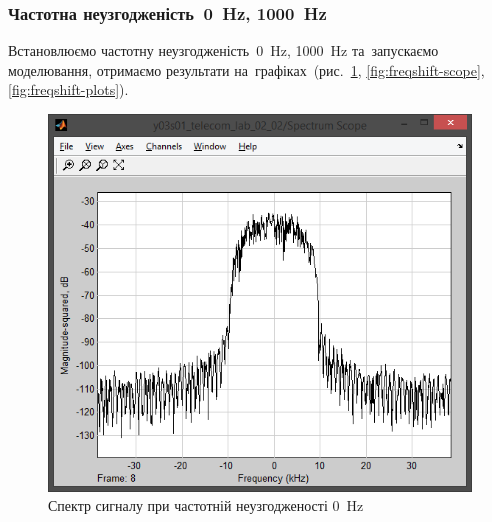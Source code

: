 \documentclass[
	a4paper,
	oneside,
	BCOR = 10mm,
	DIV = 12,
	12pt,
	headings = normal,
]{scrartcl}
\begin{document}
			\subsubsection{Частотна неузгодженість~\SI{0}{\hertz}, \SI{1000}{\hertz}}
				Встановлюємо частотну неузгодженість~\SI{0}{\hertz}, \SI{1000}{\hertz} та~запускаємо моделювання, отримаємо результати на~графіках~(рис.~\ref{fig:freqshift-spectrum-scope}, \ref{fig:freqshift-scope}, \ref{fig:freqshift-plots}).

				\begin{figure}[!htbp]
					\begin{minipage}[t]{0.5\textwidth - 0.5em}
						\centering
						\includegraphics[height = 8\baselineskip]{../01-solution/00-SNR-100db-noshift-modulator-spectrum.png}
						\caption{Спектр сигналу при частотній неузгодженості \SI{0}{\hertz}}
						\label{fig:freqshift-spectrum-scope}
					\end{minipage}\hspace{1em}%
					\begin{minipage}[t]{0.5\textwidth - 0.5em}
						\centering

\end{minipage}
\end{figure}
\end{document}
